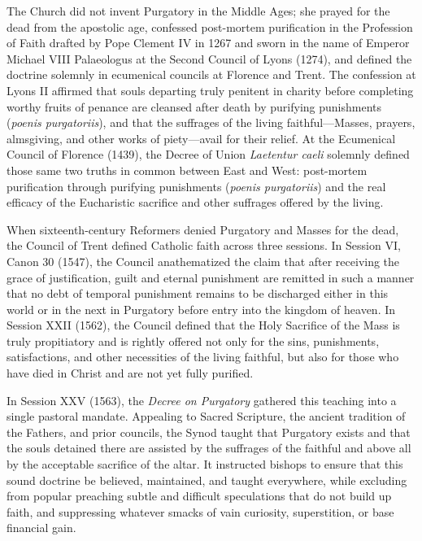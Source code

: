 The Church did not invent Purgatory in the Middle Ages; she prayed for the dead from the apostolic age, confessed post-mortem purification in the Profession of Faith drafted by Pope Clement IV in 1267 and sworn in the name of Emperor Michael VIII Palaeologus at the Second Council of Lyons (1274), and defined the doctrine solemnly in ecumenical councils at Florence and Trent. The confession at Lyons II affirmed that souls departing truly penitent in charity before completing worthy fruits of penance are cleansed after death by purifying punishments (\textit{poenis purgatoriis}), and that the suffrages of the living faithful---Masses, prayers, almsgiving, and other works of piety---avail for their relief. At the Ecumenical Council of Florence (1439), the Decree of Union \textit{Laetentur caeli} solemnly defined those same two truths in common between East and West: post-mortem purification through purifying punishments (\textit{poenis purgatoriis}) and the real efficacy of the Eucharistic sacrifice and other suffrages offered by the living.

When sixteenth-century Reformers denied Purgatory and Masses for the dead, the Council of Trent defined Catholic faith across three sessions. In Session VI, Canon 30 (1547), the Council anathematized the claim that after receiving the grace of justification, guilt and eternal punishment are remitted in such a manner that no debt of temporal punishment remains to be discharged either in this world or in the next in Purgatory before entry into the kingdom of heaven. In Session XXII (1562), the Council defined that the Holy Sacrifice of the Mass is truly propitiatory and is rightly offered not only for the sins, punishments, satisfactions, and other necessities of the living faithful, but also for those who have died in Christ and are not yet fully purified.

In Session XXV (1563), the \textit{Decree on Purgatory} gathered this teaching into a single pastoral mandate. Appealing to Sacred Scripture, the ancient tradition of the Fathers, and prior councils, the Synod taught that Purgatory exists and that the souls detained there are assisted by the suffrages of the faithful and above all by the acceptable sacrifice of the altar. It instructed bishops to ensure that this sound doctrine be believed, maintained, and taught everywhere, while excluding from popular preaching subtle and difficult speculations that do not build up faith, and suppressing whatever smacks of vain curiosity, superstition, or base financial gain.

